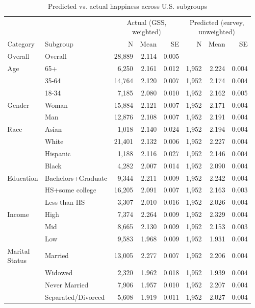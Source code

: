 \begin{table}[htbp]
\centering
\caption{Predicted vs. actual happiness across U.S. subgroups}
\begin{tabular}{llrrrrrr}
\toprule
 & & \multicolumn{3}{c}{Actual (GSS, weighted)} & \multicolumn{3}{c}{Predicted (survey, unweighted)} \\
Category & Subgroup & N & Mean & SE & N & Mean & SE \\
\midrule
Overall & Overall & 28,889 & 2.114 & 0.005 & & & \\
\midrule
Age & 65+ & 6,250 & 2.161 & 0.012 & 1,952 & 2.224 & 0.004 \\
 & 35-64 & 14,764 & 2.120 & 0.007 & 1,952 & 2.174 & 0.004 \\
 & 18-34 & 7,185 & 2.080 & 0.010 & 1,952 & 2.162 & 0.005 \\
\midrule
Gender & Woman & 15,884 & 2.121 & 0.007 & 1,952 & 2.171 & 0.004 \\
 & Man & 12,876 & 2.108 & 0.007 & 1,952 & 2.191 & 0.004 \\
\midrule
Race & Asian & 1,018 & 2.140 & 0.024 & 1,952 & 2.194 & 0.004 \\
 & White & 21,401 & 2.132 & 0.006 & 1,952 & 2.227 & 0.004 \\
 & Hispanic & 1,188 & 2.116 & 0.027 & 1,952 & 2.146 & 0.004 \\
 & Black & 4,282 & 2.007 & 0.014 & 1,952 & 2.090 & 0.004 \\
\midrule
Education & Bachelors+Graduate & 9,344 & 2.211 & 0.009 & 1,952 & 2.242 & 0.004 \\
 & HS+some college & 16,205 & 2.091 & 0.007 & 1,952 & 2.163 & 0.003 \\
 & Less than HS & 3,307 & 2.010 & 0.016 & 1,952 & 2.026 & 0.004 \\
\midrule
Income & High & 7,374 & 2.264 & 0.009 & 1,952 & 2.329 & 0.004 \\
 & Mid & 8,665 & 2.130 & 0.009 & 1,952 & 2.153 & 0.003 \\
 & Low & 9,583 & 1.968 & 0.009 & 1,952 & 1.931 & 0.004 \\
\midrule
Marital Status & Married & 13,005 & 2.277 & 0.007 & 1,952 & 2.206 & 0.004 \\
 & Widowed & 2,320 & 1.962 & 0.018 & 1,952 & 1.939 & 0.004 \\
 & Never Married & 7,906 & 1.957 & 0.010 & 1,952 & 2.207 & 0.004 \\
 & Separated/Divorced & 5,608 & 1.919 & 0.011 & 1,952 & 2.027 & 0.004 \\

\end{tabular}
\end{table}
